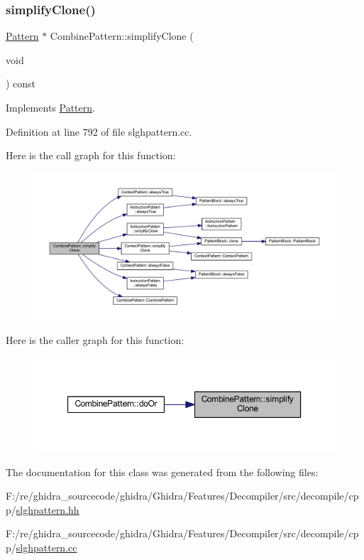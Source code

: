 \subsubsection{\texorpdfstring{simplifyClone()}{simplifyClone()}}
{\footnotesize\ttfamily \mbox{\hyperlink{class_pattern}{Pattern}} $\ast$ Combine\+Pattern\+::simplify\+Clone (\begin{DoxyParamCaption}\item[{void}]{ }\end{DoxyParamCaption}) const\hspace{0.3cm}{\ttfamily [virtual]}}



Implements \mbox{\hyperlink{class_pattern_a9c2c1383d7f836f8af237a03e463d94d}{Pattern}}.



Definition at line 792 of file slghpattern.\+cc.

Here is the call graph for this function\+:
\nopagebreak
\begin{figure}[H]
\begin{center}
\leavevmode
\includegraphics[width=350pt]{class_combine_pattern_ad6eafd26d824e0e449991267f30d818b_cgraph}
\end{center}
\end{figure}
Here is the caller graph for this function\+:
\nopagebreak
\begin{figure}[H]
\begin{center}
\leavevmode
\includegraphics[width=350pt]{class_combine_pattern_ad6eafd26d824e0e449991267f30d818b_icgraph}
\end{center}
\end{figure}


The documentation for this class was generated from the following files\+:\begin{DoxyCompactItemize}
\item 
F\+:/re/ghidra\+\_\+sourcecode/ghidra/\+Ghidra/\+Features/\+Decompiler/src/decompile/cpp/\mbox{\hyperlink{slghpattern_8hh}{slghpattern.\+hh}}\item 
F\+:/re/ghidra\+\_\+sourcecode/ghidra/\+Ghidra/\+Features/\+Decompiler/src/decompile/cpp/\mbox{\hyperlink{slghpattern_8cc}{slghpattern.\+cc}}\end{DoxyCompactItemize}
